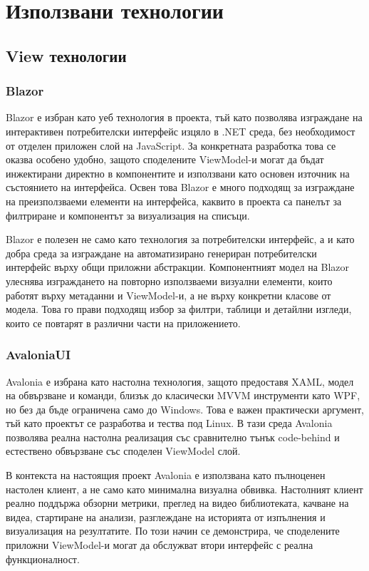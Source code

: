 \chapter{Използвани технологии}

\section{View технологии}

\subsection{Blazor}

Blazor е избран като уеб технология в проекта, тъй като позволява изграждане на интерактивен потребителски интерфейс изцяло в .NET среда, без необходимост от отделен приложен слой на JavaScript. За конкретната разработка това се оказва особено удобно, защото споделените ViewModel-и могат да бъдат инжектирани директно в компонентите и използвани като основен източник на състоянието на интерфейса. Освен това Blazor е много подходящ за изграждане на преизползваеми елементи на интерфейса, каквито в проекта са панелът за филтриране и компонентът за визуализация на списъци.

Blazor е полезен не само като технология за потребителски интерфейс, а и като добра среда за изграждане на автоматизирано генериран потребителски интерфейс върху общи приложни абстракции. Компонентният модел на Blazor улеснява изграждането на повторно използваеми визуални елементи, които работят върху метаданни и ViewModel-и, а не върху конкретни класове от модела. Това го прави подходящ избор за филтри, таблици и детайлни изгледи, които се повтарят в различни части на приложението.

\subsection{AvaloniaUI}

Avalonia е избрана като настолна технология, защото предоставя XAML, модел на обвързване и команди, близък до класически MVVM инструменти като WPF, но без да бъде ограничена само до Windows. Това е важен практически аргумент, тъй като проектът се разработва и тества под Linux. В тази среда Avalonia позволява реална настолна реализация със сравнително тънък code-behind и естествено обвързване със споделен ViewModel слой.

В контекста на настоящия проект Avalonia е използвана като пълноценен настолен клиент, а не само като минимална визуална обвивка. Настолният клиент реално поддържа обзорни метрики, преглед на видео библиотеката, качване на видеа, стартиране на анализи, разглеждане на историята от изпълнения и визуализация на резултатите. По този начин се демонстрира, че споделените приложни ViewModel-и могат да обслужват втори интерфейс с реална функционалност.

